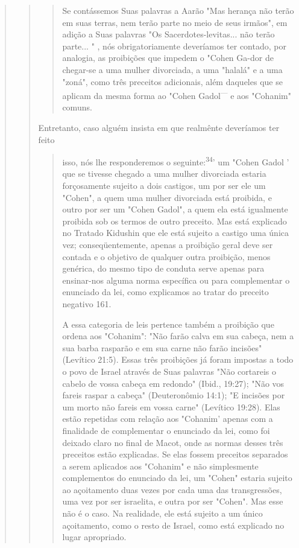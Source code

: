 \begin{quote}
\begin{quote}
\begin{quote}
Se contássemos Suas palavras a Aarão "Mas herança não terão em suas
terras, nem terão parte no meio de seus irmãos", em adição a Suas
pala­vras "Os Sacerdotes-levitas... não terão parte... " , nós
obrigatoriamente deve­ríamos ter contado, por analogia, as proibições
que impedem o "Cohen Ga-dor de chegar-se a uma mulher divorciada, a uma
"halalá" e a uma "zoná", como três preceitos adicionais, além daqueles
que se aplicam da mesma forma ao "Cohen Gadol\textsuperscript{---} e aos
"Cohanim" comuns.
\end{quote}

Entretanto, caso alguém insista em que realmênte deveríamos ter feito

\begin{quote}

isso, nós lhe responderemos o seguinte:\textsuperscript{34}' um "Cohen
Gadol ' que se tivesse chegado a uma mulher divorciada estaria
forçosamente sujeito a dois castigos, um por ser ele um "Cohen", a quem
uma mulher divorciada está proibida, e outro por ser um "Cohen Gadol", a
quem ela está igualmente proibida sob os termos de outro preceito. Mas
está explicado no Tratado Kidushin que ele está sujeito a castigo uma
única vez; conseqüentemente, apenas a proibição geral deve ser contada e
o objetivo de qualquer outra proibição, menos genérica, do mesmo tipo de
conduta serve apenas para ensinar-nos alguma norma espe­cífica ou para
complementar o enunciado da lei, como explicamos ao tratar do preceito
negativo 161.

A essa categoria de leis pertence também a proibição que ordena aos
"Cohanim": "Não farão calva em sua cabeça, nem a sua barba rasparão e em
sua carne não farão incisões" (Levítico 21:5). Essas três proibições já
foram im­postas a todo o povo de Israel através de Suas palavras "Não
cortareis o cabelo de vossa cabeça em redondo" (Ibid., 19:27); "Não vos
fareis raspar a cabeça" (Deuteronômio 14:1); "E incisões por um morto
não fareis em vossa carne" (Levítico 19:28). Elas estão repetidas com
relação aos "Cohanim' apenas com a finalidade de complementar o
enunciado da lei, como foi deixado claro no final de Macot, onde as
normas desses três preceitos estão explicadas. Se elas fossem preceitos
separados a serem aplicados aos "Cohanim" e não simples­mente
complementos do enunciado da lei, um "Cohen" estaria sujeito ao
açoi­tamento duas vezes por cada uma das transgressões, uma vez por ser
israelita, e outra por ser "Cohen". Mas esse não é o caso. Na realidade,
ele está sujeito a um único açoitamento, como o resto de Israel, como
está explicado no lugar apropriado.
\end{quote}


\end{quote}
\end{quote}
